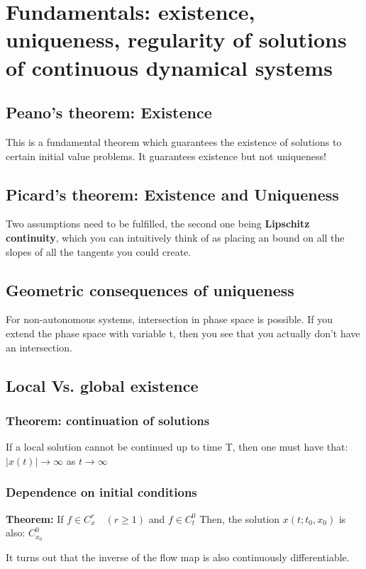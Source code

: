 \section{Fundamentals: existence, uniqueness, regularity of solutions of continuous dynamical systems}

\subsection{Peano's theorem: Existence}
This is a fundamental theorem which guarantees the existence of solutions to certain initial value problems. \danger It guarantees existence but not uniqueness! \danger

\subsection{Picard's theorem: Existence and Uniqueness}
Two assumptions need to be fulfilled, the second one being \textbf{Lipschitz continuity}, which you can intuitively think of as placing an bound on all the slopes of all the tangents you could create. 

\subsection{Geometric consequences of uniqueness}

For non-autonomous systems, intersection in phase space is possible. If you extend the phase space with variable t, then you see that you actually don't have an intersection.

\subsection{Local Vs. global existence}

\subsubsection{Theorem: continuation of solutions}
If a local solution cannot be continued up to time T, then one must have that:
$|x(t)| \rightarrow \infty$
as
$t \rightarrow \infty$

\subsubsection{Dependence on initial conditions}
\textbf{Theorem:}
If $f \in C^r_x \quad (r \geqslant 1)$ and  $ f \in C^0_t$
Then, the solution $x(t; t_0, x_0)$ is also: $C^0_{x_0}$

It turns out that the inverse of the flow map is also continuously differentiable.


